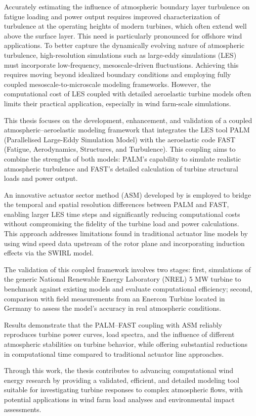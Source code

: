 Accurately estimating the influence of atmospheric boundary layer turbulence on fatigue loading and power output requires improved characterization of turbulence at the operating heights of modern turbines, which often extend well above the surface layer. This need is particularly pronounced for offshore wind applications. To better capture the dynamically evolving nature of atmospheric turbulence, high-resolution simulations such as large-eddy simulations (LES) must incorporate low-frequency, mesoscale-driven fluctuations. Achieving this requires moving beyond idealized boundary conditions and employing fully coupled mesoscale-to-microscale modeling frameworks. However, the computational cost of LES coupled with detailed aeroelastic turbine models often limits their practical application, especially in wind farm-scale simulations.

This thesis focuses on the development, enhancement, and validation of a coupled 
atmospheric–aeroelastic modeling framework that integrates the LES tool PALM (Parallelised Large-Eddy Simulation Model) with the aeroelastic code FAST (Fatigue, Aerodynamics, Structures, and Turbulence). 
This coupling aims to combine the strengths of both models: PALM's capability to simulate realistic atmospheric turbulence and FAST's detailed calculation of turbine structural loads and power output.

An innovative actuator sector method (ASM) developed by \cite{kruger2022} is employed to bridge the temporal and spatial 
resolution differences between PALM and FAST, enabling larger LES time steps and significantly reducing computational costs without compromising the fidelity of the turbine load and power calculations. 
This approach addresses limitations found in traditional actuator line models by using wind speed data upstream of the rotor plane and incorporating induction effects via the SWIRL model.

The validation of this coupled framework involves two stages: first, simulations of the generic National Renewable Energy Laboratory (NREL) 5 MW turbine \cite{NREL5MW}
to benchmark against existing models and evaluate computational efficiency; second, comparison with field measurements from an Enercon Turbine located in Germany to assess 
the model's accuracy in real atmospheric conditions.

Results demonstrate that the PALM–FAST coupling with ASM reliably reproduces turbine power curves, load spectra, and the influence of different atmospheric stabilities on turbine behavior,  while offering substantial reductions in computational time compared to traditional actuator line approaches.

Through this work, the thesis contributes to advancing computational wind energy research by providing a validated, efficient, 
and detailed modeling tool suitable for investigating turbine responses to complex atmospheric flows, with potential applications in wind farm load analyses and environmental impact assessments.


